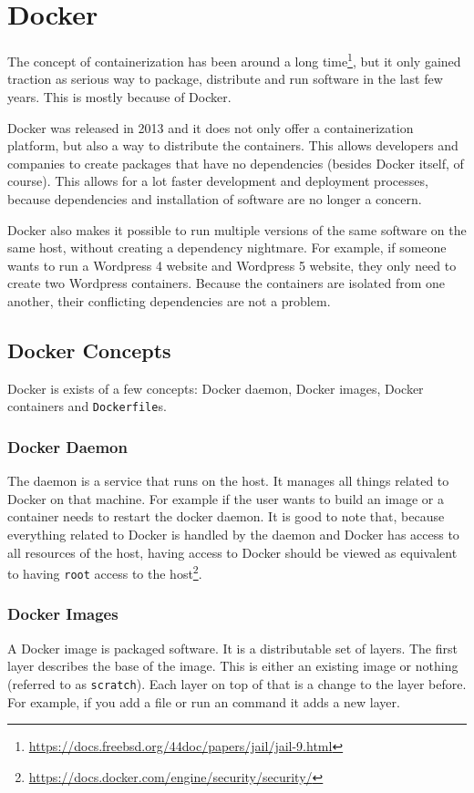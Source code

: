 \section{Docker}
The concept of containerization has been around a long time\footnote{\url{https://docs.freebsd.org/44doc/papers/jail/jail-9.html}}, but it only gained traction as serious way to package, distribute and run software in the last few years. This is mostly because of Docker.

\hfill

Docker was released in 2013 and it does not only offer a containerization platform, but also a way to distribute the containers. This allows developers and companies to create packages that have no dependencies (besides Docker itself, of course). This allows for a lot faster development and deployment processes, because dependencies and installation of software are no longer a concern.

\hfill

Docker also makes it possible to run multiple versions of the same software on the same host, without creating a dependency nightmare. For example, if someone wants to run a Wordpress 4 website and Wordpress 5 website, they only need to create two Wordpress containers. Because the containers are isolated from one another, their conflicting dependencies are not a problem.

\subsection{Docker Concepts}
Docker is exists of a few concepts: Docker daemon, Docker images, Docker containers and \lstinline{Dockerfile}s.

\subsubsection{Docker Daemon}
The daemon is a service that runs on the host. It manages all things related to Docker on that machine. For example if the user wants to build an image or a container needs to restart the docker daemon. It is good to note that, because everything related to Docker is handled by the daemon and Docker has access to all resources of the host, having access to Docker should be viewed as equivalent to having \lstinline{root} access to the host\footnote{\url{https://docs.docker.com/engine/security/security/}}.

\subsubsection{Docker Images}
A Docker image is packaged software. It is a distributable set of layers. The first layer describes the base of the image. This is either an existing image or nothing (referred to as \lstinline{scratch}). Each layer on top of that is a change to the layer before. For example, if you add a file or run an command it adds a new layer.

